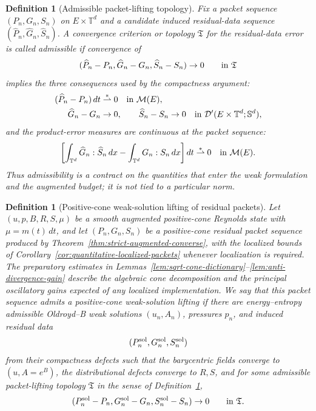 \documentclass[11pt]{article}
\numberwithin{equation}{section}
\newtheorem{definition}[theorem]{Definition}
\newcommand{\T}{\mathbb T}
\newcommand{\Sym}{\mathbb S}
\begin{document}
\begin{definition}[Admissible packet-lifting topology]
\label{def:admissible-lifting-topology}
Fix a packet sequence \((P_n,G_n,S_n)\) on \(E\times\T^d\) and a candidate
induced residual-data sequence
\((\widehat P_n,\widehat G_n,\widehat S_n)\).  A convergence criterion or
topology \(\mathfrak T\) for the residual-data error is called admissible if
convergence of
\[
  (\widehat P_n-P_n,\widehat G_n-G_n,\widehat S_n-S_n)\to0
  \qquad\hbox{in }\mathfrak T
\]
implies the three consequences used by the compactness argument:
\begin{align}
  (\widehat P_n-P_n)\,dt
  &\stackrel{*}{\rightharpoonup}0
  \quad\hbox{in }\mathcal M(E), \label{eq:packet-lift-P}\\
  \widehat G_n-G_n&\to0,\qquad
  \widehat S_n-S_n\to0
  \quad\hbox{in }\mathcal D'(E\times\T^d;\Sym^d),
  \label{eq:packet-lift-GS}
\end{align}
and the product-error measures are continuous at the packet sequence:
\begin{equation}
  \left[
  \int_{\T^d}\widehat G_n:\widehat S_n\,dx
  -\int_{\T^d}G_n:S_n\,dx
  \right]dt
  \stackrel{*}{\rightharpoonup}0
  \quad\hbox{in }\mathcal M(E).
  \label{eq:packet-lift-product}
\end{equation}
Thus admissibility is a contract on the quantities that enter the weak
formulation and the augmented budget; it is not tied to a particular norm.
\end{definition}

\begin{definition}[Positive-cone weak-solution lifting of residual packets]
\label{def:packet-lifting}
Let \((u,p,B,R,S,\mu)\) be a smooth augmented positive-cone Reynolds state with
\(\mu=m(t)\,dt\), and let \((P_n,G_n,S_n)\) be a positive-cone residual packet
sequence produced by Theorem~\ref{thm:strict-augmented-converse}, with the
localized bounds of Corollary~\ref{cor:quantitative-localized-packets} whenever
localization is required.  The preparatory estimates in
Lemmas~\ref{lem:sqrt-cone-dictionary}--\ref{lem:anti-divergence-gain} describe
the algebraic cone decomposition and the principal oscillatory gains expected
of any localized implementation.  We say that this packet sequence admits a
positive-cone weak-solution lifting if there are energy--entropy admissible
Oldroyd--B weak solutions \((u_n,A_n)\), pressures \(p_n\), and induced residual
data
\[
  (P_n^{\rm sol},G_n^{\rm sol},S_n^{\rm sol})
\]
from their compactness defects such that the barycentric fields converge to
\((u,A=e^B)\), the distributional defects converge to \(R,S\), and for some
admissible packet-lifting topology \(\mathfrak T\) in the sense of
Definition~\ref{def:admissible-lifting-topology},
\[
  (P_n^{\rm sol}-P_n,G_n^{\rm sol}-G_n,S_n^{\rm sol}-S_n)\to0
  \qquad\hbox{in }\mathfrak T .
\]
\end{definition}
\end{document}

